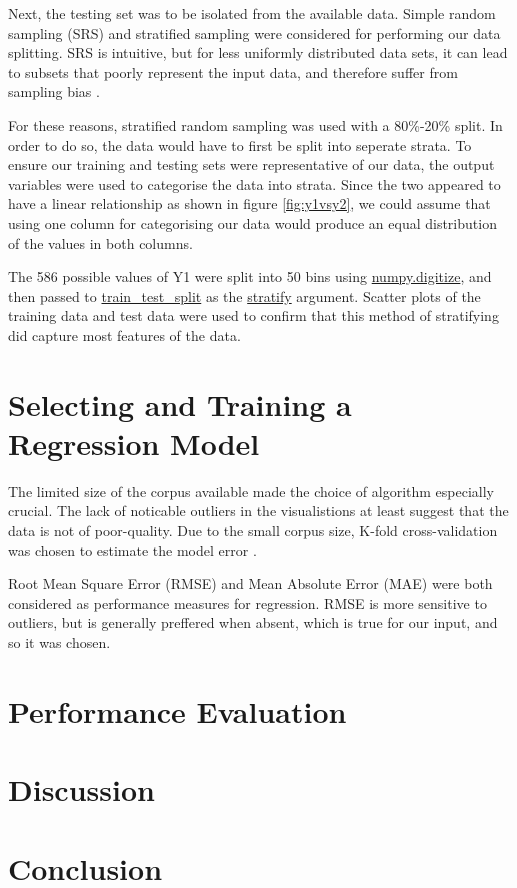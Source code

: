\documentclass[12pt]{article}
\begin{document}
Next, the testing set was to be isolated from the available data. Simple random sampling (SRS) and stratified sampling were considered for performing our data splitting. SRS is intuitive, but for less uniformly distributed data sets, it can lead to subsets that poorly represent the input data, and therefore suffer from sampling bias \cite{reitermanova_2010}. 

For these reasons, stratified random sampling was used with a 80\%-20\% split. In order to do so, the data would have to first be split into seperate strata. To ensure our training and testing sets were representative of our data, the output variables were used to categorise the data into strata. Since the two appeared to have a linear relationship as shown in figure \ref{fig:y1vsy2}, we could assume that using one column for categorising our data would produce an equal distribution of the values in both columns.

The 586 possible values of Y1 were split into 50 bins using \url{numpy.digitize}, and then passed to \url{train_test_split} as the \url{stratify} argument. Scatter plots of the training data and test data were used to confirm that this method of stratifying did capture most features of the data. 

\part{Selecting and Training a Regression Model}

The limited size of the corpus available made the choice of algorithm especially crucial. The lack of noticable outliers in the visualistions at least suggest that the data is not of poor-quality. Due to the small corpus size, K-fold cross-validation was chosen to estimate the model error \cite{gron_2018}. 

Root Mean Square Error (RMSE) and Mean Absolute Error (MAE) were both considered as performance measures for regression. RMSE is more sensitive to outliers, but is generally preffered when absent, which is true for our input, and so it was chosen. 


\part{Performance Evaluation}

\part{Discussion}

\part{Conclusion}



\end{document}
